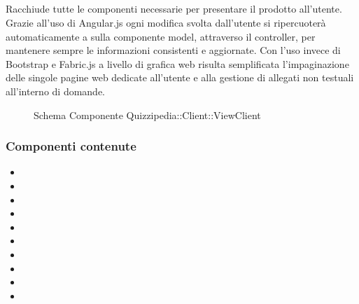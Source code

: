 \subsection{}
Racchiude tutte le componenti necessarie per presentare il prodotto all'utente.
Grazie all'uso di Angular.js ogni modifica svolta dall'utente si ripercuoterà automaticamente a sulla componente model, attraverso il controller, per mantenere sempre le informazioni consistenti e aggiornate.
Con l'uso invece di Bootstrap e Fabric.js a livello di grafica web risulta semplificata l'impaginazione delle singole pagine web dedicate all'utente e alla gestione di allegati non testuali all'interno di domande.
\begin{figure}[H]
\centering
\noindent{}
\caption[Schema Componente Quizzipedia::Client::ViewClient]{Schema Componente Quizzipedia::Client::ViewClient}
\end{figure}
\subsubsection{Componenti contenute}
\begin{itemize}
\item {}
\item {}
\item {}
\item {}
\item {}
\item {}
\item {}
\item {}
\item {}
\item {}
\end{itemize}
